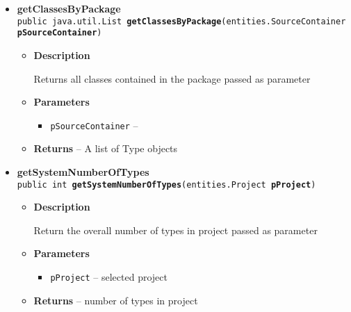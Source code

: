 {{{\begin{itemize}
{\begin{itemize}
{Returns a single class picked by id
}
\item{
{\bf  Parameters}
  \begin{itemize}
   \item{
\texttt{pId} -- }
  \end{itemize}
}%
\item{{\bf  Returns} -- 
A Type object 
}%
\end{itemize}
}%
\item{ 
\hypertarget{it.unisa.sesa.repominer.db.TypeDAO.getClassesByPackage(it.unisa.sesa.repominer.db.entities.SourceContainer)}{{\bf  getClassesByPackage}\\}
\texttt{public java.util.List\ {\bf  getClassesByPackage}(\texttt{entities.SourceContainer} {\bf  pSourceContainer})
\label{it.unisa.sesa.repominer.db.TypeDAO.getClassesByPackage(it.unisa.sesa.repominer.db.entities.SourceContainer)}}%
\begin{itemize}
\item{
{\bf  Description}

Returns all classes contained in the package passed as parameter
}
\item{
{\bf  Parameters}
  \begin{itemize}
   \item{
\texttt{pSourceContainer} -- }
  \end{itemize}
}%
\item{{\bf  Returns} -- 
A list of Type objects 
}%
\end{itemize}
}%
\item{ 
\hypertarget{it.unisa.sesa.repominer.db.TypeDAO.getSystemNumberOfTypes(it.unisa.sesa.repominer.db.entities.Project)}{{\bf  getSystemNumberOfTypes}\\}
\texttt{public int\ {\bf  getSystemNumberOfTypes}(\texttt{entities.Project} {\bf  pProject})
\label{it.unisa.sesa.repominer.db.TypeDAO.getSystemNumberOfTypes(it.unisa.sesa.repominer.db.entities.Project)}}%
\begin{itemize}
\item{
{\bf  Description}

Return the overall number of types in project passed as parameter
}
\item{
{\bf  Parameters}
  \begin{itemize}
   \item{
\texttt{pProject} -- selected project}
  \end{itemize}
}%
\item{{\bf  Returns} -- 
number of types in project 
}%
\end{itemize}
}%
\end{itemize}
}
}
}
